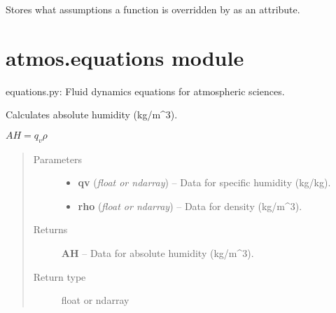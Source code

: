 \documentclass[letterpaper,10pt,english]{sphinxmanual}
\begin{document}

\begin{fulllineitems}
\label{atmos:atmos.decorators.overridden_by_assumptions}
Stores what assumptions a function is overridden by as an attribute.

\end{fulllineitems}



\section{atmos.equations module}
\label{atmos:module-atmos.equations}\label{atmos:atmos-equations-module}
equations.py: Fluid dynamics equations for atmospheric sciences.

\begin{fulllineitems}
\label{atmos:atmos.equations.AH_from_qv_rho}
Calculates absolute humidity (kg/m\textasciicircum{}3).

\(AH = q_v \rho\)
\begin{quote}\begin{description}
\item[{Parameters}] \leavevmode\begin{itemize}
\item {} 
\textbf{qv} (\emph{float or ndarray}) -- Data for specific humidity (kg/kg).

\item {} 
\textbf{rho} (\emph{float or ndarray}) -- Data for density (kg/m\textasciicircum{}3).

\end{itemize}

\item[{Returns}] \leavevmode
\textbf{AH} --
Data for absolute humidity (kg/m\textasciicircum{}3).

\item[{Return type}] \leavevmode
float or ndarray

\end{description}\end{quote}

\end{fulllineitems}
\end{document}
